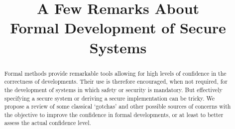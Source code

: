 \documentclass[conference]{IEEEtran}
\begin{document}
\title{A Few Remarks About\\Formal Development of Secure Systems}

\author{
\and
{}
}

\maketitle

\IEEEpeerreviewmaketitle



\begin{abstract}
Formal methods provide remarkable tools allowing for high levels of confidence in the
correctness of developments. Their use is therefore encouraged, when not required, for the
development of systems in which safety or security is mandatory. But effectively specifying a
secure system or deriving a secure implementation can be tricky. We propose a review of some
classical `gotchas' and other possible sources of concerns with the objective to improve the
confidence in formal developments, or at least to better assess the actual confidence level.
\end{abstract}



\newcommand{\NAT}
{\ensuremath{\mathbb{N}}}

\newcommand{\REL}
{\ensuremath{\mathbb{Z}}}

\newcommand{\BOOL}
{\ensuremath{\mathbb{B}}}

\newcommand{\Cmd}[1]
{\ensuremath{\mathbf{#1}}}

\newcommand{\restrdom}[2]
{{#2} \vartriangleleft {#1}}

\newcommand{\subdom}[2]
{{#2} \vartriangleleft \hspace{-10pt} - \hspace{4pt} {#1}}

\newcommand{\restrimg}[2]
{{#1} \vartriangleright {#2}}
\end{document}
